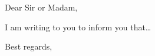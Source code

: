 \documentclass{letter}
\begin{document}
\begin{letter}{}
\opening{Dear Sir or Madam,}
{
    I am writing to you to inform you that\dots
}
\closing{Best regards,}
\end{letter}
\end{document}
